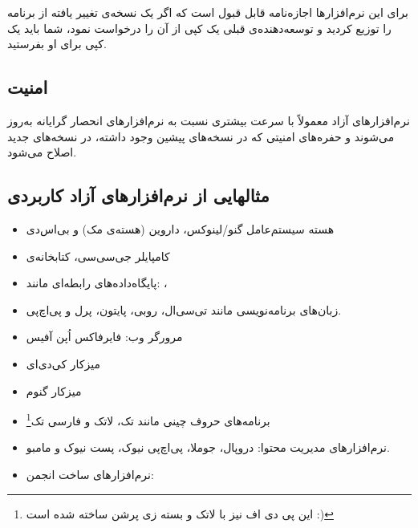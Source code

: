 برای این نرم‌افزارها اجازه‌نامه قابل قبول است که اگر یک نسخه‌ی تغییر یافته از برنامه را توزیع کردید و توسعه‌دهنده‌ی قبلی یک کپی از آن را درخواست نمود، شما باید یک کپی برای او بفرستید.
\subsection*{امنیت}
نرم‌افزارهای آزاد معمولاً با سرعت بیشتری نسبت به نرم‌افزارهای انحصار گرایانه به‌روز می‌شوند و حفره‌های امنیتی که در نسخه‌های پیشین وجود داشته، در نسخه‌های جدید اصلاح می‌شود.
\subsection*{مثالهایی از نرم‌افزارهای آزاد کاربردی}
\begin{itemize}
\renewcommand{\labelitemi}{$‎\circ‎$}
\item هسته سیستم‌عامل گنو/لینوکس، داروین (هسته‌ی مک) و بی‌اس‌دی
\item کامپایلر جی‌سی‌سی، کتابخانه‌ی 
\item پایگاه‌داده‌های رابطه‌ای مانند:
	، 
\item زبان‌های برنامه‌نویسی مانند تی‌سی‌ال، روبی، پایتون، پرل و پی‌اچ‌پی.
\item مرورگر وب: فایرفاکس
	اُپن آفیس
\item میزکار کی‌دی‌ای
\item میزکار گنوم
\item برنامه‌های حروف چینی مانند تک، لاتک و فارسی تک\footnote{این پی دی اف نیز با لاتک و بسته زی پرشن ساخته شده است :)}
\item نرم‌افزارهای مدیریت محتوا: دروپال، جوملا، پی‌اچ‌پی نیوک، پست نیوک و مامبو.
\item نرم‌افزارهای ساخت انجمن: 
\end{itemize}
